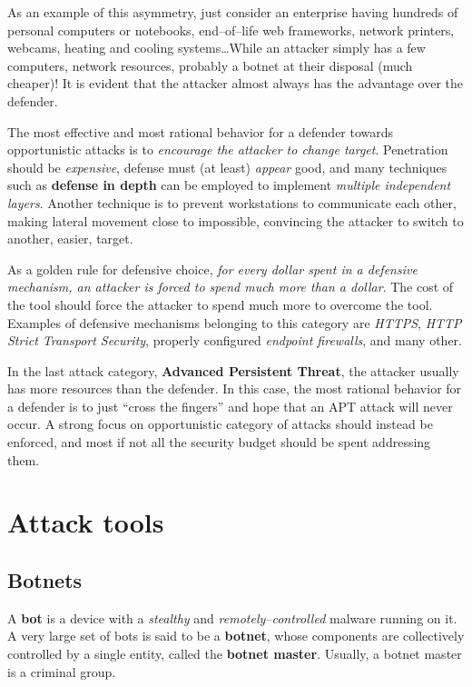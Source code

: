 \documentclass[10pt]{extreport}
\begin{document}
As an example of this asymmetry, just consider an enterprise having hundreds of
personal computers or notebooks, end--of--life web frameworks, network
printers, webcams, heating and cooling systems\dots While an attacker simply
has a few computers, network resources, probably a botnet at their disposal
(much cheaper)! It is evident that the attacker almost always has the advantage
over the defender.

The most effective and most rational behavior for a defender towards
opportunistic attacks is to \emph{encourage the attacker to change target}.
Penetration should be \emph{expensive}, defense must (at least) \emph{appear}
good, and many techniques such as \textbf{defense in depth} can be employed to
implement \emph{multiple independent layers}. Another technique is to prevent
workstations to communicate each other, making lateral movement close to
impossible, convincing the attacker to switch to another, easier, target.

As a golden rule for defensive choice, \emph{for every dollar spent in a
defensive mechanism, an attacker is forced to spend much more than a dollar}.
The cost of the tool should force the attacker to spend much more to overcome
the tool. Examples of defensive mechanisms belonging to this category are
\emph{HTTPS}, \emph{HTTP Strict Transport Security}, properly configured
\emph{endpoint firewalls}, and many other.

In the last attack category, \textbf{Advanced Persistent Threat}, the attacker
usually has more resources than the defender. In this case, the most rational
behavior for a defender is to just ``cross the fingers'' and hope that an APT
attack will never occur. A strong focus on opportunistic category of attacks
should instead be enforced, and most if not all the security budget should be
spent addressing them.

\chapter{Attack tools}

\section{Botnets}

A \textbf{bot} is a device with a \emph{stealthy} and
\emph{remotely--controlled} malware running on it. A very large set of bots is
said to be a \textbf{botnet}, whose components are collectively controlled by a
single entity, called the \textbf{botnet master}. Usually, a botnet master is a
criminal group.
\end{document}
